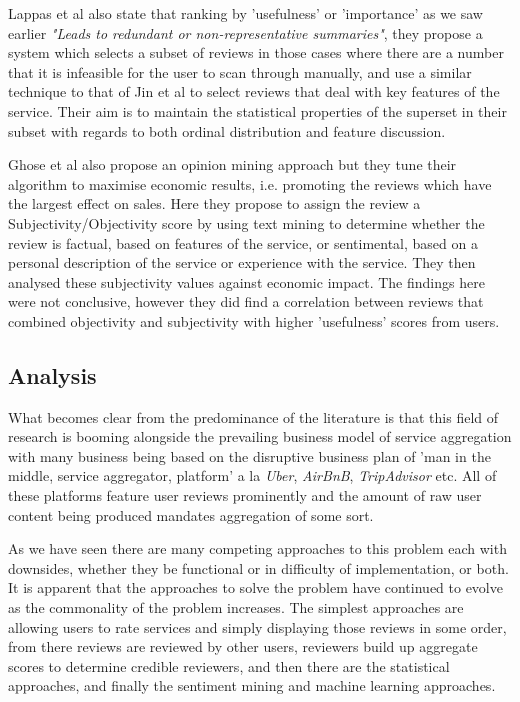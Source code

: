 Lappas et al\cite{Lappas} also state that ranking by 'usefulness' or 'importance' as we saw earlier \emph{"Leads to redundant or non-representative summaries"}, they propose a system which selects a subset of reviews in those cases where there are a number that it is infeasible for the user to scan through manually, and use a similar technique to that of Jin et al to select reviews that deal with key features of the service. Their aim is to maintain the statistical properties of the superset in their subset with regards to both ordinal distribution and feature discussion.

Ghose et al\cite{Ghose} also propose an opinion mining approach but they tune their algorithm to maximise economic results, i.e. promoting the reviews which have the largest effect on sales. Here they propose to assign the review a Subjectivity/Objectivity score by using text mining to determine whether the review is factual, based on features of the service, or sentimental, based on a personal description of the service or experience with the service. They then analysed these subjectivity values against economic impact. The findings here were not conclusive, however they did find a correlation between reviews that combined objectivity and subjectivity with higher 'usefulness' scores from users.

\subsection{Analysis}
What becomes clear from the predominance of the literature is that this field of research is booming alongside the prevailing business model of service aggregation with many business being based on the disruptive business plan of 'man in the middle, service aggregator, platform' a la \emph{Uber}, \emph{AirBnB}, \emph{TripAdvisor} etc. All of these platforms feature user reviews prominently and the amount of raw user content being produced mandates aggregation of some sort. 

As we have seen there are many competing approaches to this problem each with downsides, whether they be functional or in difficulty of implementation, or both. It is apparent that the approaches to solve the problem have continued to evolve as the commonality of the problem increases. The simplest approaches are allowing users to rate services and simply displaying those reviews in some order, from there reviews are reviewed by other users, reviewers build up aggregate scores to determine credible reviewers, and then there are the statistical approaches, and finally the sentiment mining and machine learning approaches.

